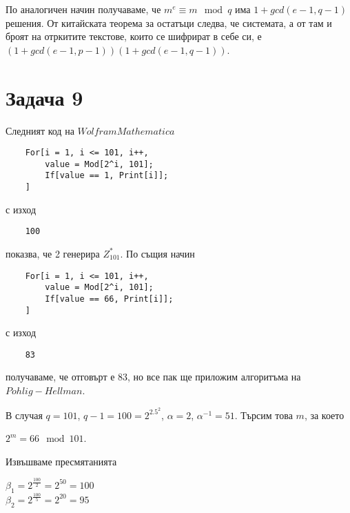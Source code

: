 \documentclass{article}
\begin{document}
\justify
По аналогичен начин получаваме, че $m^e \equiv m \mod q$ има $1 + gcd(e-1,q-1)$ решения. От китайската теорема за остатъци следва, че системата, а от там и броят на отркитите текстове, които се шифрират в себе си, е $(1 + gcd(e-1,p-1))(1 + gcd(e-1,q-1))$.

\section*{Задача 9}

\justify
Следният код на $Wolfram Mathematica$
\begin{verbatim}
    For[i = 1, i <= 101, i++,
        value = Mod[2^i, 101];
        If[value == 1, Print[i]];
    ]
\end{verbatim}
с изход 
\begin{verbatim}
    100
\end{verbatim}
показва, че 2 генерира $Z_{101}^*$. По същия начин 
\begin{verbatim}
    For[i = 1, i <= 101, i++,
        value = Mod[2^i, 101];
        If[value == 66, Print[i]];
    ]
\end{verbatim}
с изход 
\begin{verbatim}
    83
\end{verbatim}
получаваме, че отговърт е 83, но все пак ще приложим алгоритъма на $Pohlig-Hellman$.

\justify
В случая $q = 101$, $q-1 = 100 = 2^2.5^2$, $\alpha = 2$, $\alpha^{-1} = 51$. Търсим това $m$, за което 
\begin{center}
    $2^m = 66 \mod 101$.
\end{center}
Извъшваме пресмятанията
\begin{center}
    $\beta_1 = 2^{\frac{100}{2}} = 2^{50} = 100$ \\
    $\beta_2 = 2^{\frac{100}{5}} = 2^{20} = 95$
\end{center}
\end{document}
